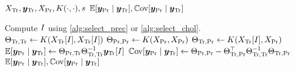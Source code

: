 \begin{algorithmic}[1]
  \REQUIRE \(
    X_{\text{Tr}}, \bm{y}_{\text{Tr}},
    X_{\text{Pr}}, K(\cdot, \cdot), s
  \)
  \ENSURE \(
      \operatorname{\mathbb{E}}[\bm{y}_{\text{Pr}} \mid \bm{y}_{\text{Tr}}],
    \operatorname{\mathbb{C}ov}[\bm{y}_{\text{Pr}} \mid \bm{y}_{\text{Tr}}]
  \)

  \STATE Compute \( I \) using
    \cref{alg:select_prec} or \cref{alg:select_chol}.
  \STATE \(
    \Theta_{\text{Tr}, \text{Tr}} \gets
    K(X_{\text{Tr}}[I], X_{\text{Tr}}[I])
  \)
  \STATE \(
    \Theta_{\text{Pr}, \text{Pr}} \gets
    K(X_{\text{Pr}}, X_{\text{Pr}})
  \)
  \STATE \(
    \Theta_{\text{Tr}, \text{Pr}} \gets
    K(X_{\text{Tr}}[I], X_{\text{Pr}})
  \)
  \STATE \(
    \operatorname{\mathbb{E}}[\bm{y}_{\text{Pr}} \mid \bm{y}_{\text{Tr}}] \gets
    \Theta_{\text{Pr}, \text{Tr}} \Theta_{\text{Tr}, \text{Tr}}^{-1}
    \bm{y}_{\text{Tr}}[I]
  \)
  \STATE \(
    \operatorname{\mathbb{C}ov}[\bm{y}_{\text{Pr}} \mid \bm{y}_{\text{Tr}}] \gets
    \Theta_{\text{Pr}, \text{Pr}} -
    \Theta_{\text{Tr}, \text{Pr}}^{\top} \Theta_{\text{Tr}, \text{Tr}}^{-1}
    \Theta_{\text{Tr}, \text{Pr}}
  \)
  \RETURN \(
      \operatorname{\mathbb{E}}[\bm{y}_{\text{Pr}} \mid \bm{y}_{\text{Tr}}],
    \operatorname{\mathbb{C}ov}[\bm{y}_{\text{Pr}} \mid \bm{y}_{\text{Tr}}]
  \)
\end{algorithmic}
